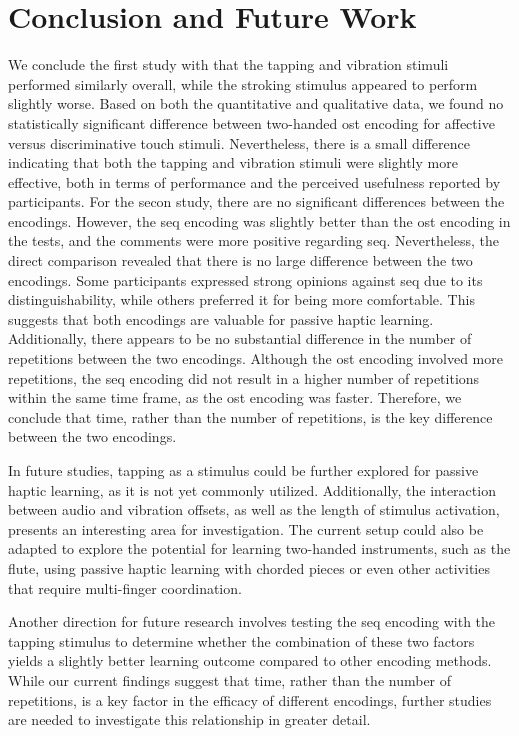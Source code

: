 \chapter{Conclusion and Future Work}
\label{ch:conclusion}

We conclude the first study with that the tapping and vibration stimuli performed similarly overall, while the stroking stimulus appeared to perform slightly worse. Based on both the quantitative and qualitative data, we found no statistically significant difference between two-handed \gls{ost} encoding for affective versus discriminative touch stimuli. Nevertheless, there is a small difference indicating that both the tapping and vibration stimuli were slightly more effective, both in terms of performance and the perceived usefulness reported by participants.
For the secon study, there are no significant differences between the encodings. However, the \gls{seq} encoding was slightly better than the \gls{ost} encoding in the tests, and the comments were more positive regarding \gls{seq}. Nevertheless, the direct comparison revealed that there is no large difference between the two encodings. Some participants expressed strong opinions against \gls{seq} due to its distinguishability, while others preferred it for being more comfortable. This suggests that both encodings are valuable for passive haptic learning. Additionally, there appears to be no substantial difference in the number of repetitions between the two encodings. Although the \gls{ost} encoding involved more repetitions, the \gls{seq} encoding did not result in a higher number of repetitions within the same time frame, as the \gls{ost} encoding was faster. Therefore, we conclude that time, rather than the number of repetitions, is the key difference between the two encodings.

In future studies, tapping as a stimulus could be further explored for passive haptic learning, as it is not yet commonly utilized. Additionally, the interaction between audio and vibration offsets, as well as the length of stimulus activation, presents an interesting area for investigation. The current setup could also be adapted to explore the potential for learning two-handed instruments, such as the flute, using passive haptic learning with chorded pieces or even other activities that require multi-finger coordination.

Another direction for future research involves testing the \gls{seq} encoding with the tapping stimulus to determine whether the combination of these two factors yields a slightly better learning outcome compared to other encoding methods. While our current findings suggest that time, rather than the number of repetitions, is a key factor in the efficacy of different encodings, further studies are needed to investigate this relationship in greater detail.

